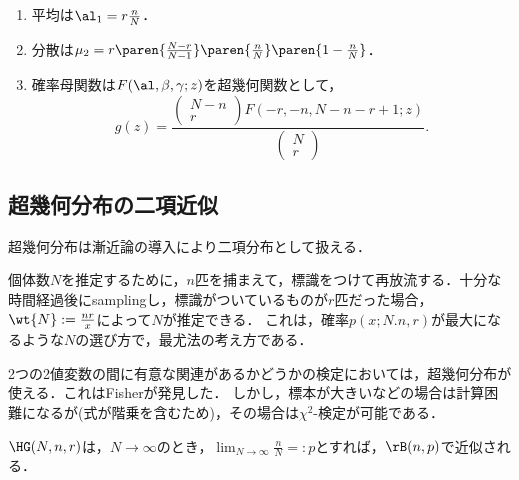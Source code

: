 \documentclass[uplatex,dvipdfmx]{jsreport}
\begin{document}
\begin{proposition}\mbox{}
    \begin{enumerate}
        \item 平均は$\al_1=r\frac{n}{N}$．
        \item 分散は$\mu_2=r\paren{\frac{N-r}{N-1}}\paren{\frac{n}{N}}\paren{1-\frac{n}{N}}$．
        \item 確率母関数は$F(\al,\beta,\gamma;z)$を超幾何関数として，
        \[g(z)=\frac{\begin{pmatrix}N-n\\r\end{pmatrix}F(-r,-n,N-n-r+1;z)}{\begin{pmatrix}N\\r\end{pmatrix}}.\]
    \end{enumerate}
\end{proposition}

\subsection{超幾何分布の二項近似}

\begin{tcolorbox}[colframe=ForestGreen, colback=ForestGreen!10!white,breakable,colbacktitle=ForestGreen!40!white,coltitle=black,fonttitle=\bfseries\sffamily,
title=]
    超幾何分布は漸近論の導入により二項分布として扱える．
\end{tcolorbox}

\begin{example}
    個体数$N$を推定するために，$n$匹を捕まえて，標識をつけて再放流する．十分な時間経過後にsamplingし，標識がついているものが$r$匹だった場合，$\wt{N}:=\frac{nr}{x}$によって$N$が推定できる．
    これは，確率$p(x;N.n,r)$が最大になるような$N$の選び方で，最尤法の考え方である．
\end{example}

\begin{example}
    2つの2値変数の間に有意な関連があるかどうかの検定においては，超幾何分布が使える．これはFisherが発見した．
    しかし，標本が大きいなどの場合は計算困難になるが(式が階乗を含むため)，その場合は$\chi^2$-検定が可能である．
\end{example}

\begin{proposition}[二項近似]
    $\HG(N,n,r)$は，$N\to\infty$のとき，$\lim_{N\to\infty}\frac{n}{N}=:p$とすれば，$\rB(n,p)$で近似される．
\end{proposition}
\end{document}
